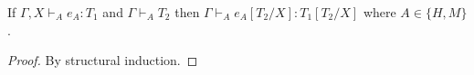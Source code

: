 \begin{lemma}
\label{tes}
If $\Gamma,X\vdash_{A}e_{A}:T_{1}$ and $\Gamma\vdash_{A}T_{2}$ then $\Gamma\vdash_{A}e_{A}[T_{2}/X]:T_{1}[T_{2}/X]$ where $A\in\lbrace H,M\rbrace$.
\begin{proof}
By structural induction.
\end{proof}
\end{lemma}